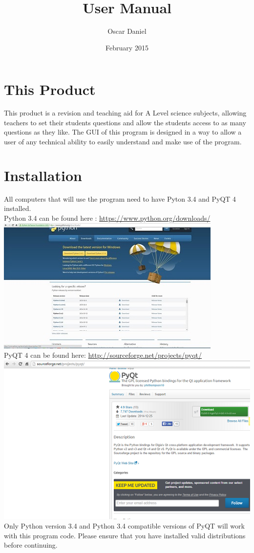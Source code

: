 \documentclass{report}
\title{User Manual}
\author{Oscar Daniel}
\date{February 2015}
\begin{document}
 
\maketitle
 
\tableofcontents
 
\chapter{This Product}
 This product is a revision and teaching aid for A Level science subjects, allowing teachers to set their students questions and allow the students access to as many questions as they like. The GUI of this program is designed in a way to allow a user of any technical ability to easily understand and make use of the program.
 


 
\chapter{Installation}
 All computers that will use the program need to have Pyton 3.4 and PyQT 4 installed.\\
 Python 3.4 can be found here : \hyperref[Python Downloads]{https://www.python.org/downloads/}\\
\includegraphics{PythonDownload}\\
 \clearpage
 PyQT 4 can be found here: \hyperref[PyQT]{http://sourceforge.net/projects/pyqt/}\\
 \includegraphics{PyQTDownload}\\
Only Python version 3.4 and Python 3.4 compatible versions of PyQT will work with this program code. Please ensure that you have installed valid distributions before continuing.\\
 
\end{document}
